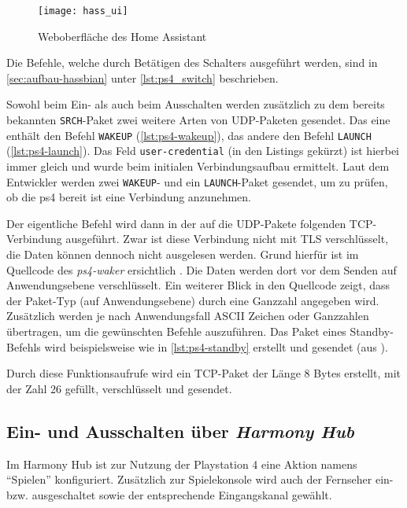 \begin{figure}[h!]
    \centering
    \texttt{[image: hass\_ui]}
    \caption{Weboberfläche des Home Assistant}\label{fig:hass-ui}
\end{figure}

Die Befehle, welche durch Betätigen des Schalters ausgeführt werden,
sind in \ref{sec:aufbau-hassbian} \textit{} unter \autoref{lst:ps4_switch} beschrieben.

Sowohl beim Ein- als auch beim Ausschalten werden zusätzlich zu dem bereits bekannten \texttt{SRCH}-Paket
zwei weitere Arten von UDP-Paketen gesendet.
Das eine enthält den Befehl \texttt{WAKEUP} (\autoref{lst:ps4-wakeup}),
das andere den Befehl \texttt{LAUNCH} (\autoref{lst:ps4-launch}).
Das Feld \texttt{user-credential} (in den Listings gekürzt) ist hierbei immer gleich
und wurde beim initialen Verbindungsaufbau ermittelt.
Laut dem Entwickler werden zwei \texttt{WAKEUP}- und ein \texttt{LAUNCH}-Paket gesendet,
um zu prüfen,
ob die \ac{ps4} bereit ist eine Verbindung anzunehmen.





Der eigentliche Befehl wird dann in der auf die UDP-Pakete folgenden TCP-Verbindung ausgeführt.
Zwar ist diese Verbindung nicht mit TLS verschlüsselt,
die Daten können dennoch nicht ausgelesen werden.
Grund hierfür ist im Quellcode des \textit{ps4-waker} ersichtlich \cite{ps4waker31:online}\cite{ps4waker93:online}.
Die Daten werden dort vor dem Senden auf Anwendungsebene verschlüsselt.
Ein weiterer Blick in den Quellcode zeigt,
dass der Paket-Typ (auf Anwendungsebene) durch eine Ganzzahl angegeben wird.
Zusätzlich werden je nach Anwendungsfall ASCII Zeichen oder Ganzzahlen übertragen,
um die gewünschten Befehle auszuführen.
Das Paket eines Standby-Befehls wird beispielsweise wie in \autoref{lst:ps4-standby} erstellt und gesendet (aus \cite{ps4waker31:online}).



Durch diese Funktionsaufrufe wird ein TCP-Paket der Länge 8 Bytes erstellt,
mit der Zahl 26 gefüllt,
verschlüsselt und gesendet.


\subsection{Ein- und Ausschalten über \textit{Harmony Hub}}\label{sec:durchfuehrung-harmony}
Im Harmony Hub ist zur Nutzung der Playstation 4 eine Aktion namens \enquote{Spielen} konfiguriert.
Zusätzlich zur Spielekonsole wird auch der Fernseher ein- bzw. ausgeschaltet sowie der entsprechende Eingangskanal gewählt.

